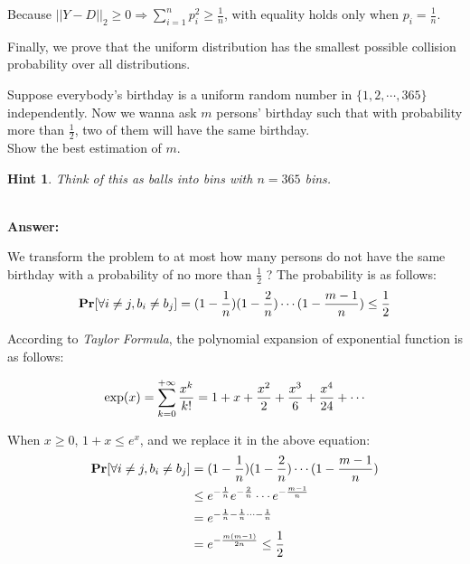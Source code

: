 \documentclass[12pt]{article}
\newcommand{\Answer}{\ \\ \textbf{Answer:} }
\newtheorem{hint}{Hint}
\begin{document}
\begin{problem}[20 points.]
Because $||Y - D||_2 \ge 0 \Rightarrow \sum_{i=1}^{n}p_i^2 \ge \frac{1}{n}$, with equality holds only when $p_i = \frac{1}{n}$. 

Finally, we prove that the uniform distribution has the smallest possible collision probability over all distributions.
\end{problem}



\begin{problem}
Suppose everybody's birthday is a uniform random number in $\{1, 2, \cdots, 365\}$ independently.
Now we wanna ask $m$ persons' birthday such that with probability more than $\frac{1}{2}$, two of them will have the same birthday. \\
\hspace*{.2in} Show the best estimation of $m$.

\begin{hint}
Think of this as balls into bins with $n = 365$ bins.
\end{hint}

\Answer

We transform the problem to at most how many persons do not have the same birthday with a probability of no more than $\frac{1}{2}$ ?
The probability is as follows:
\begin{equation}
\begin{aligned}
\mathbf{Pr}[\forall i \neq j, b_i \neq b_j] = (1 - \frac{1}{n})(1 - \frac{2}{n}) \cdots (1 - \frac{m - 1}{n}) \le \frac{1}{2} \notag
\end{aligned}
\end{equation}

According to \textit{Taylor Formula}, the polynomial expansion of exponential function is as follows:

\begin{equation}
\begin{aligned}
\exp(x) = \sum_{k=0}^{+\infty} \frac{x^k}{k!} = 1 + x + \frac{x^2}{2} + \frac{x^3}{6} + \frac{x^4}{24} + \cdots \notag
\end{aligned}
\end{equation}

When $x \ge 0$, $1 + x \le e^x$, and we replace it in the above equation:
\begin{equation}
\begin{aligned}
\mathbf{Pr}[\forall i \neq j, b_i \neq b_j] &= (1 - \frac{1}{n})(1 - \frac{2}{n}) \cdots (1 - \frac{m - 1}{n}) \\ \notag
& \le e^{-\frac{1}{n}}e^{-\frac{2}{n}} \cdots e^{-\frac{m-1}{n}} \\
& = e^{-\frac{1}{n}-\frac{1}{n} \cdots -\frac{1}{n}} \\
& = e^{-\frac{m(m-1)}{2n}} \le \frac{1}{2}
\end{aligned}
\end{equation}


\end{problem}
\end{document}
